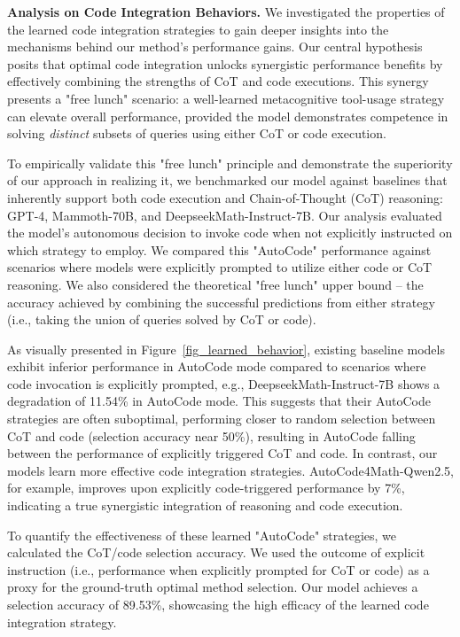 
\noindent\textbf{Analysis on Code Integration Behaviors.}
We investigated the properties of the learned code integration strategies to gain deeper insights into the mechanisms behind our method's performance gains. Our central hypothesis posits that optimal code integration unlocks synergistic performance benefits by effectively combining the strengths of CoT and code executions.  This synergy presents a "free lunch" scenario: a well-learned metacognitive tool-usage strategy can elevate overall performance, provided the model demonstrates competence in solving \emph{distinct} subsets of queries using either CoT or code execution.

To empirically validate this "free lunch" principle and demonstrate the superiority of our approach in realizing it, we benchmarked our model against baselines that inherently support both code execution and Chain-of-Thought (CoT) reasoning: GPT-4, Mammoth-70B, and DeepseekMath-Instruct-7B. Our analysis evaluated the model's autonomous decision to invoke code when not explicitly instructed on which strategy to employ. We compared this "AutoCode" performance against scenarios where models were explicitly prompted to utilize either code or CoT reasoning. We also considered the theoretical "free lunch" upper bound – the accuracy achieved by combining the successful predictions from either strategy (i.e., taking the union of queries solved by CoT or code).

As visually presented in Figure~\ref{fig_learned_behavior}, existing baseline models exhibit inferior performance in AutoCode mode compared to scenarios where code invocation is explicitly prompted, e.g., DeepseekMath-Instruct-7B shows a degradation of 11.54\% in AutoCode mode. This suggests that their AutoCode strategies are often suboptimal, performing closer to random selection between CoT and code (selection accuracy near 50\%), resulting in AutoCode falling between the performance of explicitly triggered CoT and code. In contrast, our models learn more effective code integration strategies.  AutoCode4Math-Qwen2.5, for example, improves upon explicitly code-triggered performance by 7\%, indicating a true synergistic integration of reasoning and code execution.


To quantify the effectiveness of these learned "AutoCode" strategies, we calculated the CoT/code selection accuracy. We used the outcome of explicit instruction (i.e., performance when explicitly prompted for CoT or code) as a proxy for the ground-truth optimal method selection.  Our model achieves a selection accuracy of 89.53\%, showcasing the high efficacy of the learned code integration strategy.